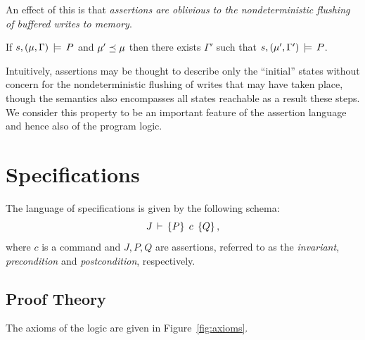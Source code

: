 \documentclass[11pt]{report}
\begin{document}
An effect of this is that \emph{assertions are oblivious to the nondeterministic flushing of buffered writes to memory}. 

\begin{corollary}
    \label{lem:flushing-closure}
    If $s,(\mu,\Gamma) \,\models\, P$ and $\mu' \preceq \mu$ then there exists $\Gamma'$ such that $s,(\mu',\Gamma') \,\models\, P$. 
\end{corollary}

Intuitively, assertions may be thought to describe only the ``initial'' states without concern for the nondeterministic flushing of writes that may have taken place, though the semantics also encompasses all states reachable as a result these steps. We consider this property to be an important feature of the assertion language and hence also of the program logic. 

\section{Specifications}
\label{sec:specifications}
\label{sec:multiprocessor-specifications}

The language of specifications is given by the following schema: \[ J\,\vdash\,\left\lbrace P \right\rbrace\;c\;\left\lbrace Q \right\rbrace, \] where $c$ is a command and $J,P,Q$ are assertions, referred to as the \emph{invariant}, \emph{precondition} and \emph{postcondition}, respectively. 

\subsection{Proof Theory}
\label{sec:proof-theory}

The axioms of the logic are given in Figure~\ref{fig:axioms}.
\end{document}
